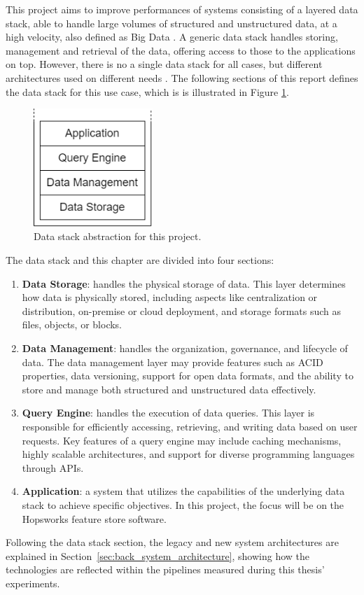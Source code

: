 This project aims to improve performances of systems consisting of a layered data stack, able to handle large volumes of structured and unstructured data, at a high velocity, also defined as Big Data \cite{PDFBigData2024}. 
A generic data stack handles storing, management and retrieval of the data, offering access to those to the applications on top. However, there is no a single data stack for all cases, but different architectures used on different needs \cite{framptonCompleteGuideOpen2018,sakrBigDataProcessing2017,IcebergExamples2024}. The following sections of this report defines the data stack for this use case, which is is illustrated in Figure \ref{fig:datastack}.

\begin{figure}[!ht]
    \begin{center}
      \includegraphics[width=0.4\textwidth]{figures/2-background_and_related_work/datastack.png}
    \end{center}
    \caption[Data stack abstraction]{Data stack abstraction for this project.}
    \label{fig:datastack}
\end{figure}

The data stack and this chapter are divided into four sections:
\begin{enumerate}
    \item \textbf{Data Storage}: handles the physical storage of data. This layer determines how data is physically stored, including aspects like centralization or distribution, on-premise or cloud deployment, and storage formats such as files, objects, or blocks.
    \item \textbf{Data Management}: handles the organization, governance, and lifecycle of data. The data management layer may provide features such as \gls{ACID} properties, data versioning, support for open data formats, and the ability to store and manage both structured and unstructured data effectively.
    \item \textbf{Query Engine}: handles the execution of data queries. This layer is responsible for efficiently accessing, retrieving, and writing data based on user requests. Key features of a query engine may include caching mechanisms, highly scalable architectures, and support for diverse programming languages through \glspl{API}.
    \item \textbf{Application}: a system that utilizes the capabilities of the underlying data stack to achieve specific objectives. In this project, the focus will be on the Hopsworks feature store software.
\end{enumerate}

Following the data stack section, the legacy and new system architectures are explained in Section~\ref{sec:back_system_architecture}, showing how the technologies are reflected within the pipelines measured during this thesis' experiments.